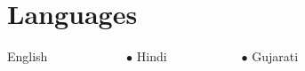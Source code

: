 \section{Languages}
 \begin{itemize}[leftmargin=0.15in]
    \small{
    \item English  \ \ \ \ \ \ \ \ \ \ \ \
    $\bullet$ Hindi\ \ \ \ \ \ \ \ \ \ \ \
    $\bullet$ Gujarati

    }
 \end{itemize}